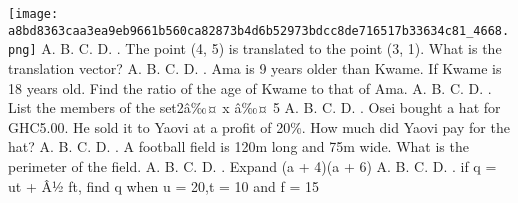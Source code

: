 \documentclass{article}
\begin{document}
\begin{multicols}{2}
  \texttt{[image: a8bd8363caa3ea9eb9661b560ca82873b4d6b52973bdcc8de716517b33634c81\_4668.png]}
 \newline \indent A. \newline \indent B. \newline \indent C. \newline \indent D.  \newline{}.  The point (4, 5) is translated to the point (3, 1). What is the translation vector? \newline \indent A. \newline \indent B. \newline \indent C. \newline \indent D.  \newline{}. Ama is 9 years older than Kwame. If Kwame is 18 years old. Find the ratio of the age of Kwame to that of Ama. \newline \indent A. \newline \indent B. \newline \indent C. \newline \indent D.  \newline{}. List the members of the set{2â‰¤ x â‰¤ 5} \newline \indent A. \newline \indent B. \newline \indent C. \newline \indent D.  \newline{}. Osei bought a hat for GHC5.00. He sold it to Yaovi at a profit of 20\%. How much did Yaovi pay for the hat? \newline \indent A. \newline \indent B. \newline \indent C. \newline \indent D.  \newline{}. A football field is 120m long and 75m wide. What is the perimeter of the field. \newline \indent A. \newline \indent B. \newline \indent C. \newline \indent D.  \newline{}. Expand (a + 4)(a + 6) \newline \indent A. \newline \indent B. \newline \indent C. \newline \indent D.  \newline{}. if q = ut + Â½ ft, find q when u = 20,t = 10 and f = 15 \newline 
\end{multicols}
\end{document}
